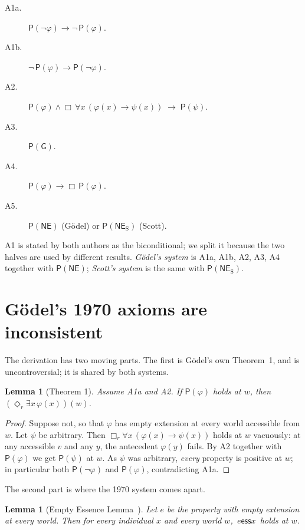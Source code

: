 \documentclass[11pt]{article}
\theoremstyle{plain}
\newtheorem{lemma}[theorem]{Lemma}
\theoremstyle{definition}
\newcommand{\ess}{\mathrel{\mathsf{ess}}}
\newcommand{\NE}{\mathsf{NE}}
\newcommand{\NES}{\mathsf{NE}_{\mathrm{S}}}
\newcommand{\Gd}{\mathsf{G}}
\newcommand{\Pos}{\mathsf{P}}
\begin{document}
\begin{description}
  \item[A1a.] $\Pos(\neg\varphi) \to \neg\,\Pos(\varphi)$.
  \item[A1b.] $\neg\,\Pos(\varphi) \to \Pos(\neg\varphi)$.
  \item[A2.] $\Pos(\varphi) \wedge \Box\,\forall x\,(\varphi(x) \to \psi(x))
             \;\to\; \Pos(\psi)$.
  \item[A3.] $\Pos(\Gd)$.
  \item[A4.] $\Pos(\varphi) \to \Box\,\Pos(\varphi)$.
  \item[A5.] $\Pos(\NE)$ \quad(G\"odel) \qquad or \qquad $\Pos(\NES)$ \quad(Scott).
\end{description}

\noindent
A1 is stated by both authors as the biconditional; we split it because the two
halves are used by different results. \emph{G\"odel's system} is
A1a, A1b, A2, A3, A4 together with $\Pos(\NE)$; \emph{Scott's system} is the
same with $\Pos(\NES)$.

\section{G\"odel's 1970 axioms are inconsistent}\label{sec:incons}

The derivation has two moving parts. The first is G\"odel's own Theorem~1, and
is uncontroversial; it is shared by both systems.

\begin{lemma}[Theorem 1]\label{lem:T1}
Assume {\rm A1a} and {\rm A2}. If $\Pos(\varphi)$ holds at $w$, then
$(\Diamond_r \exists x\, \varphi(x))(w)$.
\end{lemma}

\begin{proof}
Suppose not, so that $\varphi$ has empty extension at every world accessible
from $w$. Let $\psi$ be arbitrary. Then
$\Box_r \forall x\,(\varphi(x) \to \psi(x))$ holds at $w$ vacuously: at any
accessible $v$ and any $y$, the antecedent $\varphi(y)$ fails. By A2 together
with $\Pos(\varphi)$ we get $\Pos(\psi)$ at $w$. As $\psi$ was arbitrary,
\emph{every} property is positive at $w$; in particular both $\Pos(\neg\varphi)$
and $\Pos(\varphi)$, contradicting A1a.
\end{proof}

The second part is where the 1970 system comes apart.

\begin{lemma}[Empty Essence Lemma~\cite{bwp2016}]\label{lem:empty}
Let $e$ be the property with empty extension at every world. Then for every
individual $x$ and every world $w$, $\,e \ess x\,$ holds at $w$.
\end{lemma}
\end{document}

